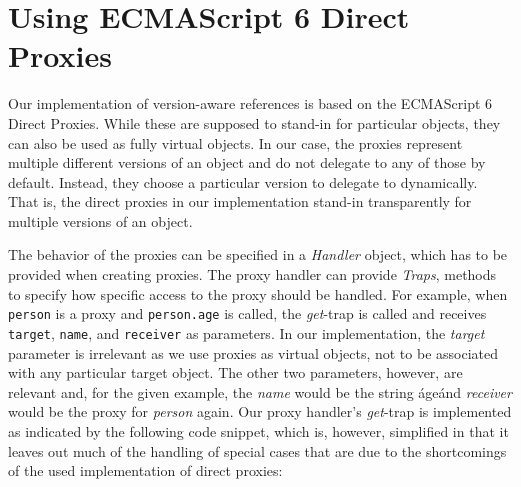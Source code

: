 \section{Using ECMAScript 6 Direct Proxies}

Our implementation of version-aware references is based on the ECMAScript 6 Direct Proxies.
While these are supposed to stand-in for particular objects, they can also be used as fully virtual objects.
In our case, the proxies represent multiple different versions of an object and do not delegate to any of those by default.
Instead, they choose a particular version to delegate to dynamically.
That is, the direct proxies in our implementation stand-in transparently for multiple versions of an object.

The behavior of the proxies can be specified in a \emph{Handler} object, which has to be provided when creating proxies.
The proxy handler can provide \emph{Traps}, methods to specify how specific access to the proxy should be handled.
For example, when \lstinline{person} is a proxy and \lstinline{person.age} is called, the \emph{get}-trap is called and receives \lstinline{target}, \lstinline{name}, and \lstinline{receiver} as parameters.
In our implementation, the \emph{target} parameter is irrelevant as we use proxies as virtual objects, not to be associated with any particular target object.
The other two parameters, however, are relevant and, for the given example, the \emph{name} would be the string \'age\' and \emph{receiver} would be the proxy for \emph{person} again.
Our proxy handler's \emph{get}-trap is implemented as indicated by the following code snippet, which is, however, simplified in that it leaves out much of the handling of special cases that are due to the shortcomings of the used implementation of direct proxies:

\iffalse
\begin{verbatim}\fi
\begin{code}{}{}
get: function(.., name, receiver) {

    var version = this.currentVersion();
    
    // proxy meta information and other special cases..
    if (name === 'isProxy') {
    // ...
    
    result = version[name];
    
    return this.ensureProxied(result);
}
\end{code}
\iffalse
\end{verbatim}\fi

